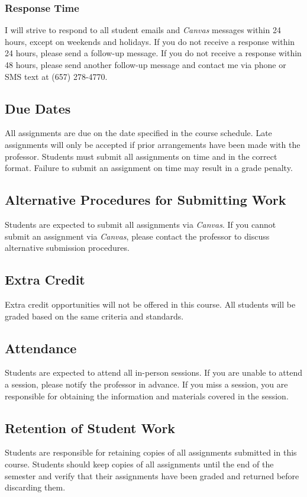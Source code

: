 \documentclass[12pt, letterpaper]{article}
\begin{document}
\subsubsection*{Response Time}I will strive to respond to all student emails and \emph{Canvas} messages within 24 hours, except on weekends and holidays. If you do not receive a response within 24 hours, please send a follow-up message. If you do not receive a response within 48 hours, please send another follow-up message and contact me via phone or SMS text at (657) 278-4770.

\subsection*{Due Dates}
All assignments are due on the date specified in the course schedule. Late assignments will only be accepted if prior arrangements have been made with the professor. Students must submit all assignments on time and in the correct format. Failure to submit an assignment on time may result in a grade penalty.

\subsection*{Alternative Procedures for Submitting Work}
Students are expected to submit all assignments via \emph{Canvas}. If you cannot submit an assignment via \emph{Canvas}, please contact the professor to discuss alternative submission procedures.

\subsection*{Extra Credit}
Extra credit opportunities will not be offered in this course. All students will be graded based on the same criteria and standards.

\subsection*{Attendance}
Students are expected to attend all in-person sessions. If you are unable to attend a session, please notify the professor in advance. If you miss a session, you are responsible for obtaining the information and materials covered in the session.

\subsection*{Retention of Student Work}
Students are responsible for retaining copies of all assignments submitted in this course. Students should keep copies of all assignments until the end of the semester and verify that their assignments have been graded and returned before discarding them.
\end{document}
